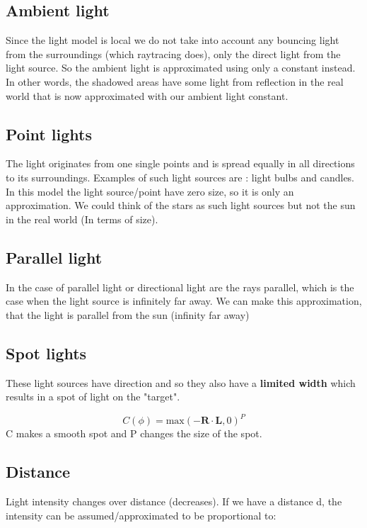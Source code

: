 	\subsection*{Ambient light}
	Since the light model is local we do not take into account any bouncing light from the surroundings (which raytracing does), only the direct light from the light source. So the ambient light is approximated using only a constant instead. In other words, the shadowed areas have some light from reflection in the real world that is now approximated with our ambient light constant. 

	\subsection*{Point lights}
	The light originates from one single points and is spread equally in all directions to its surroundings. Examples of such light sources are : light bulbs and candles. In this model the light source/point have zero size, so it is only an approximation. We could think of the stars as such light sources but not the sun in the real world (In terms of size). 

	\subsection*{Parallel light}
	In the case of parallel light or directional light are the rays parallel, which is the case when the light source is infinitely far away. We can make this approximation, that the light is parallel from the sun (infinity far away)
	
	\subsection*{Spot lights}
	These light sources have direction and so they also have a \textbf{limited width} which results in a spot of light on the "target". 

		\begin{equation}
			C(\phi) = \text{max}(-\textbf{R} \cdot \textbf{L},0)^{P}
		\end{equation}
	C makes a smooth spot and P changes the size of the spot. 

	\subsection*{Distance}
	Light intensity changes over distance (decreases). If we have a distance d, the intensity can be assumed/approximated to be proportional to:

